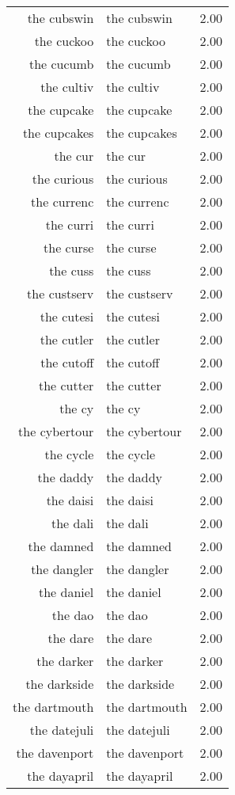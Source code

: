 \begin{table}[ht]
\begin{tabular}{rlr}
  the cubswin & the cubswin & 2.00 \\ 
  the cuckoo & the cuckoo & 2.00 \\ 
  the cucumb & the cucumb & 2.00 \\ 
  the cultiv & the cultiv & 2.00 \\ 
  the cupcake & the cupcake & 2.00 \\ 
  the cupcakes & the cupcakes & 2.00 \\ 
  the cur & the cur & 2.00 \\ 
  the curious & the curious & 2.00 \\ 
  the currenc & the currenc & 2.00 \\ 
  the curri & the curri & 2.00 \\ 
  the curse & the curse & 2.00 \\ 
  the cuss & the cuss & 2.00 \\ 
  the custserv & the custserv & 2.00 \\ 
  the cutesi & the cutesi & 2.00 \\ 
  the cutler & the cutler & 2.00 \\ 
  the cutoff & the cutoff & 2.00 \\ 
  the cutter & the cutter & 2.00 \\ 
  the cy & the cy & 2.00 \\ 
  the cybertour & the cybertour & 2.00 \\ 
  the cycle & the cycle & 2.00 \\ 
  the daddy & the daddy & 2.00 \\ 
  the daisi & the daisi & 2.00 \\ 
  the dali & the dali & 2.00 \\ 
  the damned & the damned & 2.00 \\ 
  the dangler & the dangler & 2.00 \\ 
  the daniel & the daniel & 2.00 \\ 
  the dao & the dao & 2.00 \\ 
  the dare & the dare & 2.00 \\ 
  the darker & the darker & 2.00 \\ 
  the darkside & the darkside & 2.00 \\ 
  the dartmouth & the dartmouth & 2.00 \\ 
  the datejuli & the datejuli & 2.00 \\ 
  the davenport & the davenport & 2.00 \\ 
  the dayapril & the dayapril & 2.00 \\ 

\end{tabular}
\end{table}
